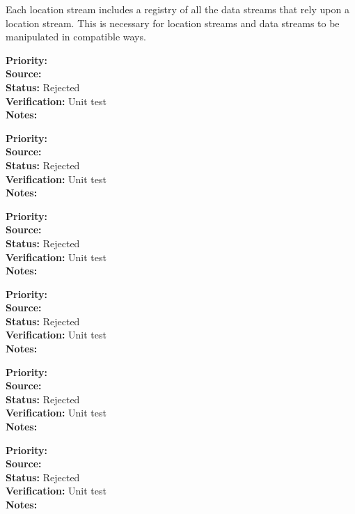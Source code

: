 Each location stream includes a registry of all the data streams that rely upon a
location stream.  This is necessary for location streams and data streams to be
manipulated in compatible ways.
\begin{reqlist}
{\bf Priority:}  \\
{\bf Source:} \\
{\bf Status:} Rejected \\
{\bf Verification:} Unit test \\
{\bf Notes:} 
\end{reqlist}
\begin{reqlist}
{\bf Priority:}  \\
{\bf Source:} \\
{\bf Status:} Rejected \\
{\bf Verification:} Unit test \\
{\bf Notes:} 
\end{reqlist}
\begin{reqlist}
{\bf Priority:}  \\
{\bf Source:} \\
{\bf Status:} Rejected \\
{\bf Verification:} Unit test \\
{\bf Notes:} 
\end{reqlist}
\begin{reqlist}
{\bf Priority:}  \\
{\bf Source:} \\
{\bf Status:} Rejected \\
{\bf Verification:} Unit test \\
{\bf Notes:} 
\end{reqlist}
\begin{reqlist}
{\bf Priority:}  \\
{\bf Source:} \\
{\bf Status:} Rejected \\
{\bf Verification:} Unit test \\
{\bf Notes:} 
\end{reqlist}
\begin{reqlist}
{\bf Priority:}  \\
{\bf Source:} \\
{\bf Status:} Rejected \\
{\bf Verification:} Unit test \\
{\bf Notes:} 
\end{reqlist}

